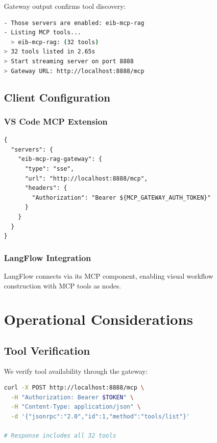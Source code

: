 \documentclass[11pt,letterpaper]{article}
\begin{document}
Gateway output confirms tool discovery:

\begin{lstlisting}[language=bash,caption={Gateway Initialization Output}]
- Those servers are enabled: eib-mcp-rag
- Listing MCP tools...
  > eib-mcp-rag: (32 tools)
> 32 tools listed in 2.65s
> Start streaming server on port 8888
> Gateway URL: http://localhost:8888/mcp
\end{lstlisting}

\subsection{Client Configuration}

\subsubsection{VS Code MCP Extension}

\begin{lstlisting}[caption={VS Code mcp.json Configuration}]
{
  "servers": {
    "eib-mcp-rag-gateway": {
      "type": "sse",
      "url": "http://localhost:8888/mcp",
      "headers": {
        "Authorization": "Bearer ${MCP_GATEWAY_AUTH_TOKEN}"
      }
    }
  }
}
\end{lstlisting}

\subsubsection{LangFlow Integration}

LangFlow connects via its MCP component, enabling visual workflow construction with MCP tools as nodes.

\section{Operational Considerations}

\subsection{Tool Verification}

We verify tool availability through the gateway:

\begin{lstlisting}[language=bash,caption={Tool List Verification}]
curl -X POST http://localhost:8888/mcp \
  -H "Authorization: Bearer $TOKEN" \
  -H "Content-Type: application/json" \
  -d '{"jsonrpc":"2.0","id":1,"method":"tools/list"}'

# Response includes all 32 tools
\end{lstlisting}
\end{document}
